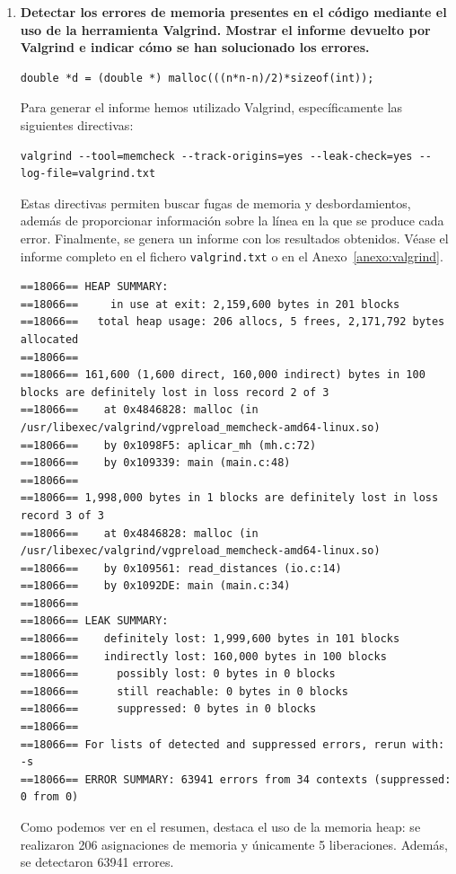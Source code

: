 \documentclass[12pt]{article}
\begin{document}
\begin{enumerate}
    \item \textbf{Detectar los errores de memoria presentes en el código mediante el uso de la herramienta
Valgrind. Mostrar el informe devuelto por Valgrind e indicar cómo se han solucionado los
errores.}


\begin{lstlisting}[breaklines=true]
double *d = (double *) malloc(((n*n-n)/2)*sizeof(int));
\end{lstlisting}

Para generar el informe hemos utilizado Valgrind, específicamente las siguientes directivas:

\begin{lstlisting}[style=EstiloValgrind]
valgrind --tool=memcheck --track-origins=yes --leak-check=yes --log-file=valgrind.txt

\end{lstlisting}
Estas directivas permiten buscar fugas de memoria y desbordamientos, además de proporcionar información sobre la línea en la que se produce cada error. Finalmente, se genera un informe con los resultados obtenidos. Véase el informe completo en el fichero \texttt{valgrind.txt} o en el Anexo~\ref{anexo:valgrind}.

\begin{lstlisting}[style=EstiloValgrind]
==18066== HEAP SUMMARY:
==18066==     in use at exit: 2,159,600 bytes in 201 blocks
==18066==   total heap usage: 206 allocs, 5 frees, 2,171,792 bytes allocated
==18066==
==18066== 161,600 (1,600 direct, 160,000 indirect) bytes in 100 blocks are definitely lost in loss record 2 of 3
==18066==    at 0x4846828: malloc (in /usr/libexec/valgrind/vgpreload_memcheck-amd64-linux.so)
==18066==    by 0x1098F5: aplicar_mh (mh.c:72)
==18066==    by 0x109339: main (main.c:48)
==18066==
==18066== 1,998,000 bytes in 1 blocks are definitely lost in loss record 3 of 3
==18066==    at 0x4846828: malloc (in /usr/libexec/valgrind/vgpreload_memcheck-amd64-linux.so)
==18066==    by 0x109561: read_distances (io.c:14)
==18066==    by 0x1092DE: main (main.c:34)
==18066==
==18066== LEAK SUMMARY:
==18066==    definitely lost: 1,999,600 bytes in 101 blocks
==18066==    indirectly lost: 160,000 bytes in 100 blocks
==18066==      possibly lost: 0 bytes in 0 blocks
==18066==      still reachable: 0 bytes in 0 blocks
==18066==      suppressed: 0 bytes in 0 blocks
==18066==
==18066== For lists of detected and suppressed errors, rerun with: -s
==18066== ERROR SUMMARY: 63941 errors from 34 contexts (suppressed: 0 from 0)
\end{lstlisting}
Como podemos ver en el resumen, destaca el uso de la memoria heap: se realizaron 206 asignaciones de memoria y únicamente 5 liberaciones. Además, se detectaron 63941 errores.


\end{enumerate}
\end{document}
